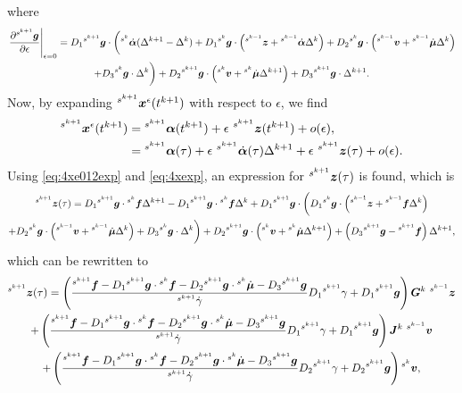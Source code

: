 \documentclass[../DC2017114Bouma.tex]{subfiles}
\begin{document}
where
\begin{multline}
\left.\frac{\partial\ls^{s^{k+1}}\gb}{\partial\epsilon}\right|_{\epsilon=0} = D_1\ls^{s^{k+1}}\gb\cdot\bigg(\ls^{s^k}\dot{\alphab}(\Delta^{k+1}-\Delta^{k}) + D_1\ls^{s^k}\gb\cdot\left(\ls^{s^{k-1}}\zb+\ls^{s^{k-1}}\dot{\alphab}\Delta^{k}\right) + D_2\ls^{s^k}\gb\cdot\left(\ls^{s^{k-1}}\vb+\ls^{s^{k-1}}\dot{\mub}\Delta^{k}\right) \\ + D_3\ls^{s^k}\gb\cdot\Delta^{k} \bigg)+ D_2 \ls^{s^{k+1}}\gb\cdot\left(\ls^{s^{k}}\vb+\ls^{s^{k}}\dot{\mub}\Delta^{k+1} \right) + D_3\ls^{s^{k+1}}\gb\cdot\Delta^{k+1}. \label{eq:4dg1de}
\end{multline}
Now, by expanding $\ls^{s^{k+1}}\xb^\epsilon(t^{k+1})$ with respect to $\epsilon$, we find
\begin{align}
\ls^{s^{k+1}}\xb^\epsilon(t^{k+1}) &= \ls^{s^{k+1}}\alphab(t^{k+1})+\epsilon\ ^{s^{k+1}}\zb(t^{k+1}) + o(\epsilon),\\
&= \ls^{s^{k+1}}\alphab(\tau) + \epsilon\ ^{s^{k+1}}\dot{\alphab}(\tau)\Delta^{k+1} + \epsilon\ ^{s^{k+1}}\zb(\tau) + o(\epsilon).\label{eq:4xexp}
\end{align}
Using \eqref{eq:4xe012exp} and \eqref{eq:4xexp}, an expression for $\ls^{s^{k+1}}\zb(\tau)$ is found, which is
\begin{multline}
\ls^{s^{k+1}}\zb(\tau) = D_1\ls^{s^{k+1}}\gb\cdot\ls^{s^{k}}\fb\Delta^{k+1} - D_1\ls^{s^{k+1}}\gb\cdot\ls^{s^{k}}\fb\Delta^{k} + D_1\ls^{s^{k+1}}\gb\cdot \bigg( D_1\ls^{s^{k}}\gb\cdot\left(\ls^{s^{k-1}}\zb+\ls^{s^{k-1}}\fb\Delta^{k}\right)\\
+D_2\ls^{s^{k}}\gb\cdot\left(\ls^{s^{k-1}}\vb+\ls^{s^{k-1}}\dot{\mub}\Delta^{k}\right)+D_3\ls^{s^{k}}\gb\cdot\Delta^{k}\bigg) + D_2 \ls^{s^{k+1}}\gb\cdot\left(\ls^{s^{k}}\vb+\ls^{s^{k}}\dot{\mub}\Delta^{k+1} \right) + \left(D_3\ls^{s^{k+1}}\gb - \ls^{s^{k+1}}\fb\right)\Delta^{k+1},\label{eq:4ztau}
\end{multline}
which can be rewritten to 
\begin{multline}
\ls^{s^{k+1}}\zb(\tau) = \left(\frac{\ls^{s^{k+1}}\fb - D_1\ls^{s^{k+1}}\gb\cdot\ls^{s^{k}}\fb  - D_2\ls^{s^{k+1}}\gb\cdot\ls^{s^{k}}\dot{\mub} - D_3\ls^{s^{k+1}}\gb}{\ls^{s^{k+1}}\dot{\gamma}}D_1\ls^{s^{k+1}}\gamma + D_1\ls^{s^{k+1}}\gb\right)\Gb^{k}\ ^{s^{k-1}}\zb\\
+ \left(\frac{\ls^{s^{k+1}}\fb - D_1\ls^{s^{k+1}}\gb\cdot\ls^{s^{k}}\fb - D_2\ls^{s^{k+1}}\gb\cdot\ls^{s^{k}}\dot{\mub} - D_3\ls^{s^{k+1}}\gb}{\ls^{s^{k+1}}\dot{\gamma}}D_1\ls^{s^{k+1}}\gamma + D_1\ls^{s^{k+1}}\gb\right)\Jb^{k}\ ^{s^{k-1}}\vb\\
+ \left(\frac{\ls^{s^{k+1}}\fb-D_1\ls^{s^{k+1}}\gb\cdot\ls^{s^{k}}\fb - D_2\ls^{s^{k+1}}\gb\cdot\ls^{s^{k}}\dot{\mub} - D_3\ls^{s^{k+1}}\gb}{\ls^{s^{k+1}}\dot{\gamma}}D_2\ls^{s^{k+1}}\gamma + D_2\ls^{s^{k+1}}\gb\right)\ls^{s^{k}}\vb,
\end{multline}
\end{document}
